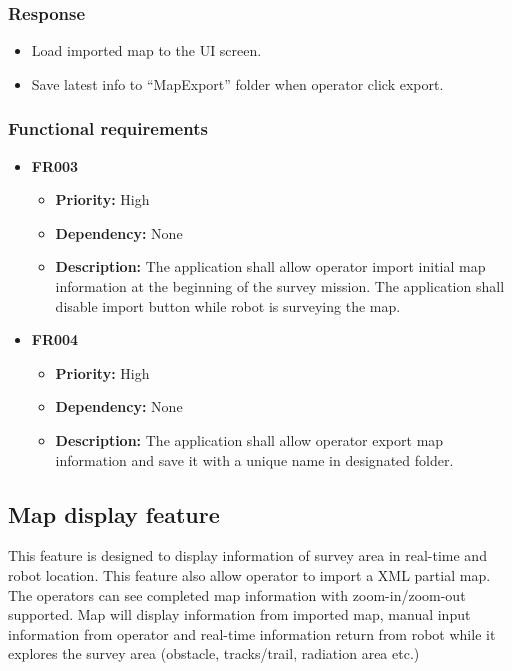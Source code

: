 \documentclass[10pt,a4paper,titlepage]{article}
\begin{document}
	\subsubsection*{Response}
	\begin{itemize}
		\item Load imported map to the UI screen.
		\item Save latest info to “MapExport” folder when operator click export.
	\end{itemize}
	
	\subsubsection*{Functional requirements}
	\begin{itemize}
		
		\item \textbf{FR003} 
		\begin{itemize}
			\item \textbf{Priority:} High
			\item \textbf{Dependency:} None
			\item \textbf{Description:} The application shall allow operator import initial map information at the beginning of the survey mission. The application shall disable import button while robot is surveying the map.
		\end{itemize}
	
		\item \textbf{FR004} 
		\begin{itemize}
			\item \textbf{Priority:} High
			\item \textbf{Dependency:} None
			\item \textbf{Description:} The application shall allow operator export map information and save it with a unique name in designated folder.
		\end{itemize}
	\end{itemize}
	
	\subsection{Map display feature}
	This feature is designed to display information of survey area in real-time and robot location. This feature also allow operator to import a XML partial map. The operators can see completed map information with zoom-in/zoom-out supported. Map will display information from imported map, manual input information from operator and real-time information return from robot while it explores the survey area (obstacle, tracks/trail, radiation area etc.)
	
\end{document}
